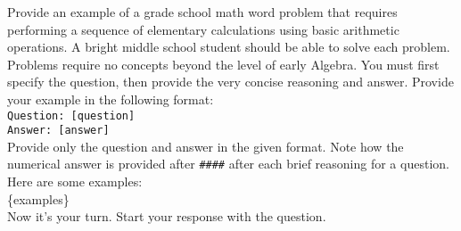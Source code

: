 \begin{tcolorbox}[colback=orange!5!white,colframe=orange!75!black,title=Instruct Few-shot Prompt]
Provide an example of a grade school math word problem that requires performing a sequence of elementary calculations using basic arithmetic operations. A bright middle school student should be able to solve each problem. Problems require no concepts beyond the level of early Algebra. You must first specify the question, then provide the very concise reasoning and answer. Provide your example in the following format:\\

\texttt{Question: [question]} \\
\texttt{Answer: [answer]}\\

Provide only the question and answer in the given format. Note how the numerical answer is provided after \texttt{\#\#\#\#} after each brief reasoning for a question. Here are some examples:\\

\{examples\}\\

Now it's your turn. Start your response with the question.
\end{tcolorbox}
